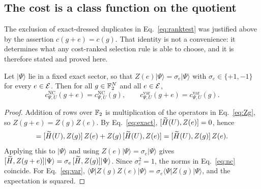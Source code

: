 %

\subsection{The cost is a class function on the quotient}
\label{sec:classfunction}

The exclusion of exact-dressed duplicates in Eq.~\eqref{eq:ranktest} was
justified above by the assertion $c(g+e)=c(g)$. That identity is not a
convenience: it determines what any cost-ranked selection rule is able to
choose, and it is therefore stated and proved here.

\begin{proposition}
\label{prop:coset}
Let $|\Psi\rangle$ lie in a fixed exact sector, so that $Z(e)|\Psi\rangle
=\sigma_e|\Psi\rangle$ with $\sigma_e\in\{+1,-1\}$ for every $e\in\mathcal E$. Then
for all $g\in\mathbb F_2^{N}$ and all $e\in\mathcal E$,
\begin{equation}
c^{\mathrm{NC}}_{\Psi,U}(g+e)=c^{\mathrm{NC}}_{\Psi,U}(g),
\qquad
c^{\mathrm{var}}_{\Psi,U}(g+e)=c^{\mathrm{var}}_{\Psi,U}(g).
\label{eq:cosetinvariance}
\end{equation}
\end{proposition}

\begin{proof}
Addition of rows over $\mathbb F_2$ is multiplication of the operators in
Eq.~\eqref{eq:Zg}, so $Z(g+e)=Z(g)Z(e)$. By Eq.~\eqref{eq:exact},
$[\widetilde H(U),Z(e)]=0$, hence
\begin{equation}
[\Ht(U),Z(g)Z(e)]
=[\Ht(U),Z(g)]\,Z(e)+Z(g)\,[\Ht(U),Z(e)]
=[\Ht(U),Z(g)]\,Z(e).
\label{eq:commexpand}
\end{equation}
Applying this to $|\Psi\rangle$ and using $Z(e)|\Psi\rangle=\sigma_e|\Psi\rangle$
gives $[\widetilde H,Z(g+e)]|\Psi\rangle=\sigma_e\,[\widetilde H,Z(g)]|\Psi\rangle$. Since
$\sigma_e^{2}=1$, the norms in Eq.~\eqref{eq:nc} coincide. For
Eq.~\eqref{eq:var}, $\langle\Psi|Z(g)Z(e)|\Psi\rangle
=\sigma_e\langle\Psi|Z(g)|\Psi\rangle$, and the expectation is squared.
\end{proof}

